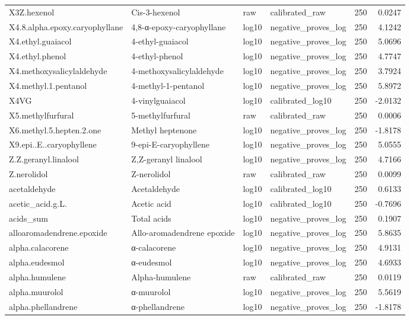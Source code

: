 {\begin{longtable}{llllrr}
X3Z.hexenol & Cis-3-hexenol & raw & calibrated\_raw & 250 & 0.0247 \\
X4.8.alpha.epoxy.caryophyllane & 4,8-α-epoxy-caryophyllane & log10 & negative\_proves\_log & 250 & 4.1242 \\
X4.ethyl.guaiacol & 4-ethyl-guaiacol & log10 & negative\_proves\_log & 250 & 5.0696 \\
X4.ethyl.phenol & 4-ethyl-phenol & log10 & negative\_proves\_log & 250 & 4.7747 \\
X4.methoxysalicylaldehyde & 4-methoxysalicylaldehyde & log10 & negative\_proves\_log & 250 & 3.7924 \\
X4.methyl.1.pentanol & 4-methyl-1-pentanol & log10 & negative\_proves\_log & 250 & 5.8972 \\
X4VG & 4-vinylguaiacol & log10 & calibrated\_log10 & 250 & -2.0132 \\
X5.methylfurfural & 5-methylfurfural & raw & calibrated\_raw & 250 & 0.0006 \\
X6.methyl.5.hepten.2.one & Methyl heptenone & log10 & negative\_proves\_log & 250 & -1.8178 \\
X9.epi..E..caryophyllene & 9-epi-E-caryophyllene & log10 & negative\_proves\_log & 250 & 5.0555 \\
Z.Z.geranyl.linalool & Z,Z-geranyl linalool & log10 & negative\_proves\_log & 250 & 4.7166 \\
Z.nerolidol & Z-nerolidol & raw & calibrated\_raw & 250 & 0.0099 \\
acetaldehyde & Acetaldehyde & log10 & calibrated\_log10 & 250 & 0.6133 \\
acetic\_acid.g.L. & Acetic acid & log10 & calibrated\_log10 & 250 & -0.7696 \\
acids\_sum & Total acids & log10 & negative\_proves\_log & 250 & 0.1907 \\
alloaromadendrene.epoxide & Allo-aromadendrene epoxide & log10 & negative\_proves\_log & 250 & 5.8635 \\
alpha.calacorene & α-calacorene & log10 & negative\_proves\_log & 250 & 4.9131 \\
alpha.eudesmol & α-eudesmol & log10 & negative\_proves\_log & 250 & 4.6933 \\
alpha.humulene & Alpha-humulene & raw & calibrated\_raw & 250 & 0.0119 \\
alpha.muurolol & α-muurolol & log10 & negative\_proves\_log & 250 & 5.5619 \\
alpha.phellandrene & α-phellandrene & log10 & negative\_proves\_log & 250 & -1.8178 \\

\end{longtable}}
